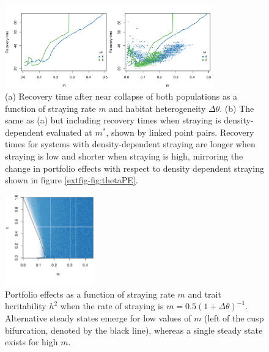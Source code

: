 \documentclass{revtex4}
\begin{document}
\begin{figure}
  \captionsetup{justification=raggedright,
singlelinecheck=false
}
\centering
\includegraphics[width=0.8\textwidth]{fig_relaxtheta2.pdf}
\caption{
(a) Recovery time after near collapse of both populations as a function of straying rate $m$ and habitat heterogeneity $\Delta\theta$.
(b) The same as (a) but including recovery times when straying is density-dependent evaluated at $m^*$, shown by linked point pairs.
Recovery times for systems with density-dependent straying are longer when straying is low and shorter when straying is high, mirroring the change in portfolio effects with respect to density dependent straying shown in figure \ref{extfig-fig:thetaPE}.
} \label{fig:relaxtheta}
\end{figure}



\begin{figure}
  \captionsetup{justification=raggedright,
singlelinecheck=false
}
  \centering
  \includegraphics[width=0.35\textwidth]{fig_MDPE_hm_mtheta_rt.pdf}
  \caption{
  Portfolio effects as a function of straying rate $m$ and trait heritability $h^2$ when the rate of straying is $m = 0.5(1 + \Delta\theta)^{-1}$. Alternative steady states emerge for low values of $m$ (left of the cusp bifurcation, denoted by the black line), whereas a single steady state exists for high $m$.
  } \label{fig:mthetaPE}
\end{figure}

\end{document}
